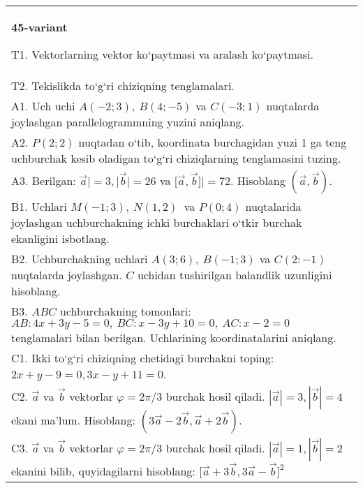 \documentclass{article}
\begin{document}
\begin{tabular}{m{17cm}}
\textbf{45-variant}

T1. 
Vektorlarning vektor ko‘paytmasi va aralash ko‘paytmasi.
 \\
T2. 
Tekislikda to‘g‘ri chiziqning tenglamalari.
 \\
A1. 
Uch uchi $A (-2;3), \ B (4;-5) $ va
$C (-3;1)$ nuqtalarda joylashgan parallelogrammning yuzini aniqlang.
 \\
A2. 
$P (2;2)$ nuqtadan o‘tib, koordinata burchagidan
yuzi 1 ga teng uchburchak kesib oladigan to‘g‘ri chiziqlarning
tenglamasini tuzing.
 \\
A3. 
Berilgan: $\overrightarrow{a}| = 3,|\overrightarrow{b}| = 26$ va
$\lbrack\overrightarrow{a},\overrightarrow{b}\rbrack| = 72$. Hisoblang
$\left(\overrightarrow{a},\overrightarrow{b} \right) $.
 \\
B1. 
Uchlari \(M (-1;3),\ N (1,2) \ \) va \(P (0;4) \)
nuqtalarida joylashgan uchburchakning ichki burchaklari o‘tkir burchak
ekanligini isbotlang.
 \\
B2. 
Uchburchakning uchlari \(A (3;6),\ B (-1;3) \) va
\(C (2:-1) \) nuqtalarda joylashgan. $C$ uchidan tushirilgan balandlik uzunligini hisoblang.
 \\
B3. 
$ABC$ uchburchakning tomonlari:
\(AB:4x+3y-5=0,\ BC:x-3y+10=0,\ AC:x-2=0\) 
tenglamalari bilan berilgan. Uchlarining koordinatalarini aniqlang.
 \\
C1. 
Ikki to‘g‘ri chiziqning chetidagi burchakni toping: $2x+y-9=0, 3x-y+11=0$.
 \\
C2. 
$\vec{a}$ va $\vec{b}$ vektorlar $\varphi = 2\pi/3$ burchak hosil qiladi. $|\vec{a}| = 3,|\vec{b}| = 4$ ekani ma’lum. Hisoblang:
$\left(3\vec{a} - 2\vec{b},\vec{a} + 2\vec{b} \right) $.
 \\
C3. 
$\vec{a}$ va $\vec{b}$ vektorlar $\varphi = 2\pi/3$ burchak hosil qiladi. $|\vec{a}| = 1,|\vec{b}| = 2$ ekanini bilib, quyidagilarni hisoblang:
$\lbrack\overrightarrow{a} + 3\overrightarrow{b},3\overrightarrow{a} - \overrightarrow{b}\rbrack^{2}$
 \\

\end{tabular}
\vspace{1cm}
\end{document}
